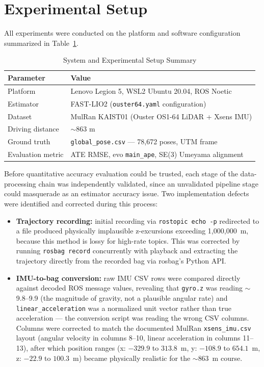 \documentclass[conference]{IEEEtran}
\begin{document}
\section{Experimental Setup}
All experiments were conducted on the platform and software configuration summarized in Table~\ref{tab:setup}.

\begin{table}[htbp]
\caption{System and Experimental Setup Summary}
\label{tab:setup}
\centering
\begin{tabular}{p{}p{}}
\toprule
\textbf{Parameter} & \textbf{Value} \\
\midrule
Platform & Lenovo Legion 5, WSL2 Ubuntu 20.04, ROS Noetic \\
Estimator & FAST-LIO2 (\texttt{ouster64.yaml} configuration) \\
Dataset & MulRan KAIST01 (Ouster OS1-64 LiDAR + Xsens IMU) \\
Driving distance & $\sim$863 m \\
Ground truth & \texttt{global\_pose.csv} --- 78,672 poses, UTM frame \\
Evaluation metric & ATE RMSE, evo \texttt{main\_ape}, SE(3) Umeyama alignment \\
\bottomrule
\end{tabular}
\end{table}

Before quantitative accuracy evaluation could be trusted, each stage of the data-processing chain was independently validated, since an unvalidated pipeline stage could masquerade as an estimator accuracy issue. Two implementation defects were identified and corrected during this process:

\begin{itemize}
\item \textbf{Trajectory recording:} initial recording via \texttt{rostopic echo -p} redirected to a file produced physically implausible z-excursions exceeding 1{,}000{,}000~m, because this method is lossy for high-rate topics. This was corrected by running \texttt{rosbag record} concurrently with playback and extracting the trajectory directly from the recorded bag via rosbag's Python API.
\item \textbf{IMU-to-bag conversion:} raw IMU CSV rows were compared directly against decoded ROS message values, revealing that \texttt{gyro.z} was reading $\sim$9.8--9.9 (the magnitude of gravity, not a plausible angular rate) and \texttt{linear\_acceleration} was a normalized unit vector rather than true acceleration --- the conversion script was reading the wrong CSV columns. Columns were corrected to match the documented MulRan \texttt{xsens\_imu.csv} layout (angular velocity in columns 8--10, linear acceleration in columns 11--13), after which position ranges (x: $-329.9$ to $313.8$~m, y: $-108.9$ to $654.1$~m, z: $-22.9$ to $100.3$~m) became physically realistic for the $\sim$863~m course.
\end{itemize}
\end{document}
